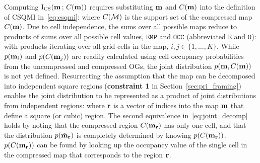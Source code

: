 Computing $\text{I}_{\text{CS}}(\mathbf{m}\, ;\, C(\mathbf{m}))$ requires substituting
$\mathbf{m}$ and $C(\mathbf{m})$ into the definition of CSQMI
in~\eqref{eq:csqmi}:
%
%
where $C(\mathcal{M})$ is the support set of the compressed map $C(\mathbf{m})$.
Due to cell independence, the sums over all possible maps reduce to products
of sums over all possible cell values, $\texttt{EMP}$ and $\texttt{OCC}$
(abbreviated $\texttt{E}$ and $\texttt{O}$):
%
%
with products iterating over all grid cells in the map, $i, j \in \{1,\dots,K\}$.
While $p(\mathbf{m}_{i})$ and $p(C(\mathbf{m}_{j}))$ are readily calculated using cell
occupancy probabilities from the uncompressed and compressed OGs, the joint distribution
$p(\mathbf{m}, C(\mathbf{m}))$ is not yet defined. Resurrecting the assumption that
the map can be decomposed into independent square regions
({\bf constraint 1} in Section~\ref{sec:pri_framing}) enables
the joint distribution to be represented as a product of joint distributions from independent
regions:
%
%
where $\mathbf{r}$ is a vector of indices into the map $\mathbf{m}$ that define a
square (or cubic) region. The second equivalence in~\eqref{eq:joint_decomp} holds
by noting that the compressed region $C(\mathbf{m}_{\mathbf{r}})$ has only one cell, and
that the distribution $p(\tilde{\mathbf{m}}_{\mathbf{r}})$ is completely determined by
knowing $p(C(\mathbf{m}_{\mathbf{r}}))$. $p(C(\mathbf{m}_{\mathbf{r}}))$ can be found by looking up the occupancy
value of the single cell in the compressed map that corresponds to the region $\mathbf{r}$.

